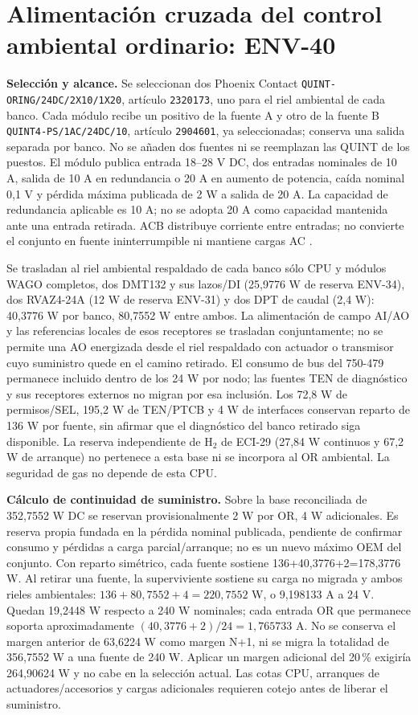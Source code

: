 \section{Alimentación cruzada del control ambiental ordinario: ENV-40}
\label{sec:ambiente-env40}
\textbf{Selección y alcance.} Se seleccionan dos Phoenix Contact \texttt{QUINT-ORING/24DC/2X10/1X20}, artículo \texttt{2320173}, uno para el riel ambiental de cada banco. Cada módulo recibe un positivo de la fuente A y otro de la fuente B \texttt{QUINT4-PS/1AC/24DC/10}, artículo \texttt{2904601}, ya seleccionadas; conserva una salida separada por banco. No se añaden dos fuentes ni se reemplazan las QUINT de los puestos. El módulo publica entrada 18--28 V DC, dos entradas nominales de 10 A, salida de 10 A en redundancia o 20 A en aumento de potencia, caída nominal 0,1 V y pérdida máxima publicada de 2 W a salida de 20 A. La capacidad de redundancia aplicable es 10 A; no se adopta 20 A como capacidad mantenida ante una entrada retirada. ACB distribuye corriente entre entradas; no convierte el conjunto en fuente ininterrumpible ni mantiene cargas AC \parencite[pp.~1--3]{lote40-oring-ficha}\parencite{lote40-oring-catalogo}.

Se trasladan al riel ambiental respaldado de cada banco sólo CPU y módulos WAGO completos, dos DMT132 y sus lazos/DI (25,9776 W de reserva ENV-34), dos RVAZ4-24A (12 W de reserva ENV-31) y dos DPT de caudal (2,4 W): 40,3776 W por banco, 80,7552 W entre ambos. La alimentación de campo AI/AO y las referencias locales de esos receptores se trasladan conjuntamente; no se permite una AO energizada desde el riel respaldado con actuador o transmisor cuyo suministro quede en el camino retirado. El consumo de bus del 750-479 permanece incluido dentro de los 24 W por nodo; las fuentes TEN de diagnóstico y sus receptores externos no migran por esa inclusión. Los 72,8 W de permisos/SEL, 195,2 W de TEN/PTCB y 4 W de interfaces conservan reparto de 136 W por fuente, sin afirmar que el diagnóstico del banco retirado siga disponible. La reserva independiente de H$_2$ de ECI-29 (27,84 W continuos y 67,2 W de arranque) no pertenece a esta base ni se incorpora al OR ambiental. La seguridad de gas no depende de esta CPU.

\textbf{Cálculo de continuidad de suministro.} Sobre la base reconciliada de 352,7552 W DC se reservan provisionalmente 2 W por OR, 4 W adicionales. Es reserva propia fundada en la pérdida nominal publicada, pendiente de confirmar consumo y pérdidas a carga parcial/arranque; no es un nuevo máximo OEM del conjunto. Con reparto simétrico, cada fuente sostiene 136+40,3776+2=178,3776 W. Al retirar una fuente, la superviviente sostiene su carga no migrada y ambos rieles ambientales: $136+80,7552+4=220,7552$ W, o 9,198133 A a 24 V. Quedan 19,2448 W respecto a 240 W nominales; cada entrada OR que permanece soporta aproximadamente $(40,3776+2)/24=1,765733$ A. No se conserva el margen anterior de 63,6224 W como margen N+1, ni se migra la totalidad de 356,7552 W a una fuente de 240 W. Aplicar un margen adicional del 20\,\% exigiría 264,90624 W y no cabe en la selección actual. Las cotas CPU, arranques de actuadores/accesorios y cargas adicionales requieren cotejo antes de liberar el suministro.

